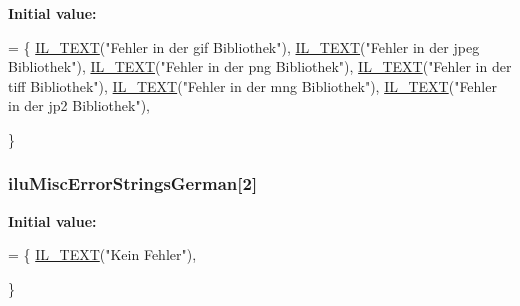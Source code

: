 {\bfseries Initial value\-:}
\begin{DoxyCode}
= \{
    \hyperlink{il_8h_a2907c2129d2ba2ebbae6aa6a69b7f685}{IL\_TEXT}(\textcolor{stringliteral}{"Fehler in der gif Bibliothek"}),
    \hyperlink{il_8h_a2907c2129d2ba2ebbae6aa6a69b7f685}{IL\_TEXT}(\textcolor{stringliteral}{"Fehler in der jpeg Bibliothek"}),
    \hyperlink{il_8h_a2907c2129d2ba2ebbae6aa6a69b7f685}{IL\_TEXT}(\textcolor{stringliteral}{"Fehler in der png Bibliothek"}),
    \hyperlink{il_8h_a2907c2129d2ba2ebbae6aa6a69b7f685}{IL\_TEXT}(\textcolor{stringliteral}{"Fehler in der tiff Bibliothek"}),
    \hyperlink{il_8h_a2907c2129d2ba2ebbae6aa6a69b7f685}{IL\_TEXT}(\textcolor{stringliteral}{"Fehler in der mng Bibliothek"}),
    \hyperlink{il_8h_a2907c2129d2ba2ebbae6aa6a69b7f685}{IL\_TEXT}(\textcolor{stringliteral}{"Fehler in der jp2 Bibliothek"}),

\}
\end{DoxyCode}
\hypertarget{ilu__err-german_8h_a1e3d20fd3db63366ca2994b892f46134}{
\subsubsection[{ilu\-Misc\-Error\-Strings\-German}]{ ilu\-Misc\-Error\-Strings\-German\mbox{[}2\mbox{]}}}\label{ilu__err-german_8h_a1e3d20fd3db63366ca2994b892f46134}
{\bfseries Initial value\-:}
\begin{DoxyCode}
= \{
    \hyperlink{il_8h_a2907c2129d2ba2ebbae6aa6a69b7f685}{IL\_TEXT}(\textcolor{stringliteral}{"Kein Fehler"}),

\}
\end{DoxyCode}
